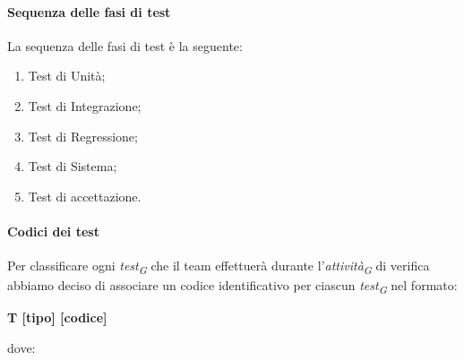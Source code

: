 \paragraph{Sequenza delle fasi di test}
La sequenza delle fasi di test è la seguente:

\begin{enumerate}
    \item Test di Unità;
    \item Test di Integrazione;
    \item Test di Regressione;
    \item Test di Sistema;
    \item Test di accettazione.
\end{enumerate}

\paragraph{Codici dei test}
Per classificare ogni \textit{test}\textsubscript{\textit{G}} che il team effettuerà durante l'\textit{attività}\textsubscript{\textit{G}} di verifica abbiamo deciso di associare un codice identificativo per ciascun \textit{test}\textsubscript{\textit{G}} nel formato: 

\begin{center}
    \textbf{T [tipo] [codice]}
\end{center}

dove:

